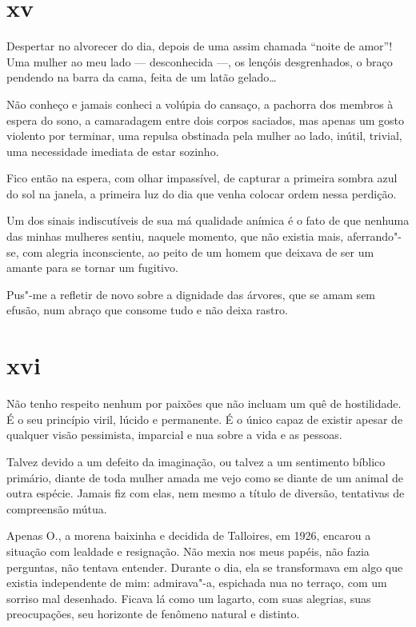\section{xv}

Despertar no alvorecer do dia, depois de uma assim chamada ``noite de
amor''! Uma mulher ao meu lado --- desconhecida ---, os lençóis
desgrenhados, o braço pendendo na barra da cama, feita de um latão
gelado\ldots{}

Não conheço e jamais conheci a volúpia do cansaço, a pachorra dos
membros à espera do sono, a camaradagem entre dois corpos saciados, mas
apenas um gosto violento por terminar, uma repulsa obstinada pela mulher
ao lado, inútil, trivial, uma necessidade imediata de estar sozinho.

Fico então na espera, com olhar impassível, de capturar a primeira
sombra azul do sol na janela, a primeira luz do dia que venha colocar
ordem nessa perdição.

Um dos sinais indiscutíveis de sua má qualidade anímica é o fato de que
nenhuma das minhas mulheres sentiu, naquele momento, que não existia
mais, aferrando"-se, com alegria inconsciente, ao peito de um homem que
deixava de ser um amante para se tornar um fugitivo.

Pus"-me a refletir de novo sobre a dignidade das árvores, que se amam sem
efusão, num abraço que consome tudo e não deixa rastro.

\section{xvi}

Não tenho respeito nenhum por paixões que não incluam um quê de
hostilidade. É o seu princípio viril, lúcido e permanente. É o único
capaz de existir apesar de qualquer visão pessimista, imparcial e nua
sobre a vida e as pessoas.

Talvez devido a um defeito da imaginação, ou talvez a um
sentimento bíblico primário, diante de toda mulher amada me vejo como
se diante de um animal de outra espécie. Jamais fiz com elas, nem mesmo
a título de diversão, tentativas de compreensão mútua.

Apenas O., a morena baixinha e decidida de Talloires, em 1926, encarou a
situação com lealdade e resignação. Não mexia nos meus papéis, não fazia
perguntas, não tentava entender. Durante o dia, ela se transformava em
algo que existia independente de mim: admirava"-a, espichada nua no
terraço, com um sorriso mal desenhado. Ficava lá como um lagarto, com
suas alegrias, suas preocupações, seu horizonte de fenômeno natural e
distinto.

